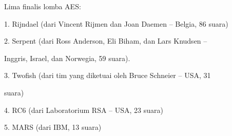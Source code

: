 \documentclass{article}
\begin{document}

Lima finalis lomba AES:

1. Rijndael (dari Vincent Rijmen dan Joan Daemen – Belgia, 86 suara)

2. Serpent (dari Ross Anderson, Eli Biham, dan Lars Knudsen – 

Inggris, Israel, dan Norwegia, 59 suara).

3. Twofish (dari tim yang diketuai oleh Bruce Schneier – USA, 31 

suara)

4. RC6 (dari Laboratorium RSA – USA, 23 suara)

5. MARS (dari IBM, 13 suara)
\end{document}
